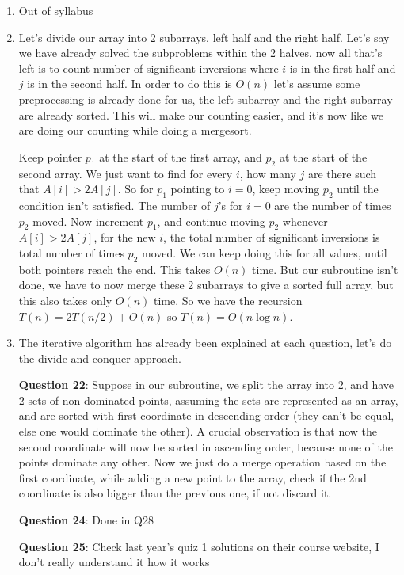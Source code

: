 \documentclass[12pt]{report}
\begin{document}
\begin{enumerate}[label=\textbf{\arabic*.}]
  \item Out of syllabus
  
  \item Let's divide our array into 2 subarrays, left half and the right half. Let's say we have already solved the subproblems within the 2
  halves, now all that's left is to count number of significant inversions where $i$ is in the first half and $j$ is in the second half. In order to 
  do this is $O(n)$ let's assume some preprocessing is already done for us, the left subarray and the right subarray are already sorted. This will
  make our counting easier, and it's now like we are doing our counting while doing a mergesort.
  
  Keep pointer $p_1$ at the start of the first array, and $p_2$ at the start of the second array. We just want to find for every $i$, how many $j$
  are there such that $A[i] > 2A[j]$. So for $p_1$ pointing to $i=0$, keep moving $p_2$ until the condition isn't satisfied. The number of $j$'s for 
  $i=0$ are the number of times $p_2$ moved. Now increment $p_1$, and continue moving $p_2$ whenever $A[i] > 2A[j]$, for the new $i$, the total number 
  of significant inversions is total number of times $p_2$ moved. We can keep doing this for all values, until both pointers reach the end. This takes 
  $O(n)$ time. But our subroutine isn't done, we have to now merge these 2 subarrays to give a sorted full array, but this also takes only $O(n)$ time.
  So we have the recursion $T(n) = 2T(n/2) + O(n)$ so $T(n) = O(n \log n)$.

  \item The iterative algorithm has already been explained at each question, let's do the divide and conquer approach.
  
  \textbf{Question 22}:
  Suppose in our subroutine, we split the array into 2, and have 2 sets of non-dominated points, assuming the sets are represented as an array, and 
  are sorted with first coordinate in descending order (they can't be equal, else one would dominate the other). A crucial observation is that now the second
  coordinate will now be sorted in ascending order, because none of the points dominate any other. Now we just do a merge operation based on the first 
  coordinate, while adding a new point to the array, check if the 2nd coordinate is also bigger than the previous one, if not discard it.

  \textbf{Question 24}:
  Done in Q28

  \textbf{Question 25}:
  Check last year's quiz 1 solutions on their course website, I don't really understand it how it works


\end{enumerate}
\end{document}
